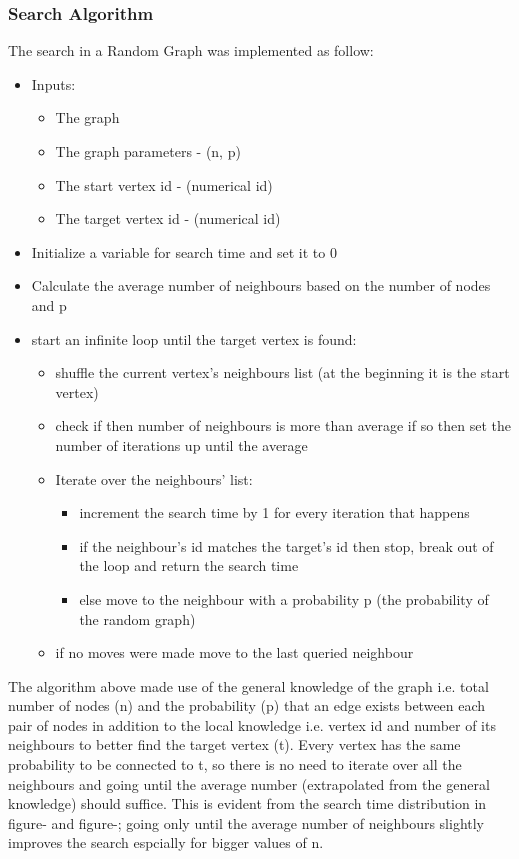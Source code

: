 \documentclass[11pt,a4paper,notitlepage]{article}
\begin{document}
\subsubsection*{Search Algorithm}
The search in a Random Graph was implemented as follow:
\begin{itemize}
    \item Inputs:
    \begin{itemize}
        \item The graph
        \item The graph parameters - (n, p)
        \item The start vertex id - (numerical id)
        \item The target vertex id - (numerical id)
    \end{itemize}
    \item Initialize a variable for search time and set it to 0
    \item Calculate the average number of neighbours based on the number of nodes and p
    \item start an infinite loop until the target vertex is found:
    \begin{itemize}
        \item shuffle the current vertex's neighbours list (at the beginning it is the start vertex)
        \item check if then number of neighbours is more than average if so then set the number of iterations up until the average
        \item Iterate over the neighbours' list:
        \begin{itemize}
            \item increment the search time by 1 for every iteration that happens
            \item if the neighbour's id matches the target's id then stop, break out of the loop and return the search time
            \item else move to the neighbour with a probability p (the probability of the random graph)
        \end{itemize}
        \item if no moves were made move to the last queried neighbour
    \end{itemize}
\end{itemize}
The algorithm above made use of the general knowledge of the graph i.e. total number of nodes (n) and the probability (p) that an edge exists between each pair of nodes in addition to the local knowledge i.e. vertex id and number of its neighbours to better find the target vertex (t). Every vertex has the same probability to be connected to t, so there is no need to iterate over all the neighbours and going until the average number (extrapolated from the general knowledge) should suffice. This is evident from the search time distribution in figure- and figure-; going only until the average number of neighbours slightly improves the search espcially for bigger values of n.  
\end{document}
